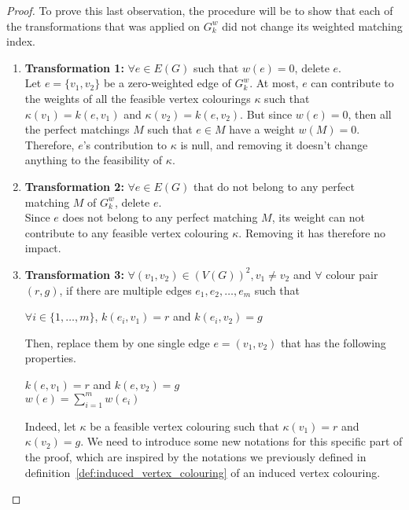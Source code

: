 \begin{proof}
    To prove this last observation, the procedure will be to show that each of the transformations that was applied on $G_k^w$ did not change its weighted matching index.

    \begin{enumerate}
        \item \textbf{Transformation 1:} $\forall e \in E(G)$ such that $w(e) = 0$, delete $e$. \\
            Let $e = \{v_1, v_2\}$ be a zero-weighted edge of $G_k^w$.
            At most, $e$ can contribute to the weights of all the feasible vertex colourings $\kappa$ such that $\kappa(v_1) = k(e, v_1)$ and $\kappa(v_2) = k(e, v_2)$.
            But since $w(e) = 0$, then all the perfect matchings $M$ such that $e \in M$ have a weight $w(M) = 0$.
            Therefore, $e$'s contribution to $\kappa$ is null, and removing it doesn't change anything to the feasibility of $\kappa$.

        \item \textbf{Transformation 2:} $\forall e \in E(G)$ that do not belong to any perfect matching $M$ of $G_k^w$, delete $e$. \\
            Since $e$ does not belong to any perfect matching $M$, its weight can not contribute to any feasible vertex colouring $\kappa$.
            Removing it has therefore no impact.

        \item \textbf{Transformation 3:} $\forall (v_1, v_2) \in (V(G))^2, v_1 \neq v_2$ and $\forall$ colour pair $(r, g)$, if there are multiple edges $e_1, e_2, \dots, e_m$ such that
            \begin{center}
                $\forall i \in \{1, \dots, m\}$, $k(e_i, v_1) = r$ and $k(e_i, v_2) = g$
            \end{center}
            Then, replace them by one single edge $e = (v_1, v_2)$ that has the following properties.
            \begin{center}
                $k(e, v_1) = r$ and $k(e, v_2) = g$ \\
                $w(e) = \sum\limits_{i = 1}^m w(e_i)$
            \end{center}

            Indeed, let $\kappa$ be a feasible vertex colouring such that $\kappa(v_1) = r$ and $\kappa(v_2) = g$.
            We need to introduce some new notations for this specific part of the proof, which are inspired by the notations we previously defined in definition~\ref{def:induced_vertex_colouring} of an induced vertex colouring.


\end{enumerate}
\end{proof}
